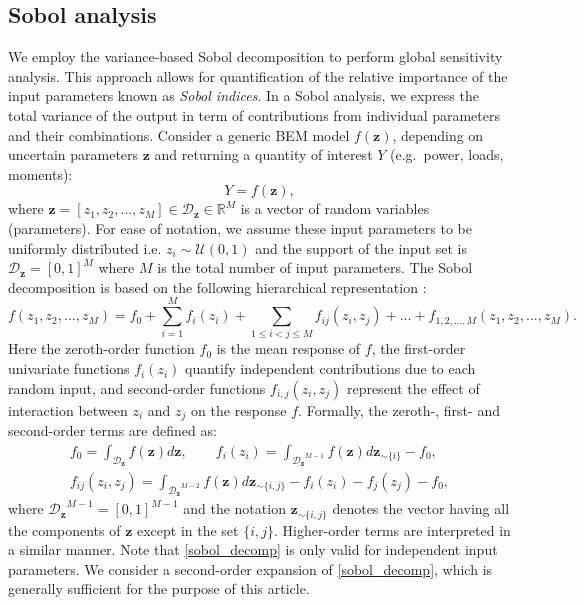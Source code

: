 \subsection{Sobol analysis}
We employ the variance-based Sobol decomposition to perform global sensitivity analysis. This approach allows for quantification of the relative importance of the input parameters known as \emph{Sobol indices}. In a Sobol analysis, we express the total variance of the output in term of contributions from individual parameters and their combinations. Consider a generic BEM model $f(\mathbf{z})$, depending on uncertain parameters $\mathbf{z}$ and returning a quantity of interest $Y$ (e.g.\ power, loads, moments):
\begin{equation}\label{nonlinear_model}
Y = f({\mathbf{z}}),
\end{equation}
where ${\mathbf{z}} = [z_1, z_2, ..., z_M]\in \mathcal{D}_{\mathbf{z}}\in \mathbb{R}^M$ is a vector of random variables (parameters). For ease of notation, we assume these input parameters to be uniformly distributed i.e. $z_i \sim \mathcal{U}(0,1)$ and the support of the input set is $\mathcal{D}_{\mathbf{z}} = [0,1]^M$ where $M$ is the total number of input parameters. The Sobol decomposition is based on the following hierarchical representation \cite{RSmith}:
\begin{equation}\label{sobol_decomp}
f(z_1, z_2, ..., z_M) = f_0+\sum_{i=1}^M f_i(z_i) + \sum_{1\leq i<j\leq M} f_{ij}(z_i,z_j) + ... + f_{1, 2, ..., M}(z_1, z_2, ..., z_M).
\end{equation}
Here the zeroth-order function $f_0$ is the mean response of $f$, the first-order univariate functions $f_i(z_i)$ quantify independent contributions due to each random input, and second-order functions $f_{i,j}(z_i,z_j)$ represent the effect of interaction between $z_i$ and $z_j$ on the response $f$. Formally, the zeroth-, first- and second-order terms are defined as:
\begin{align}\label{sobol_terms}
f_0 = \int_{\mathcal{D}_{\mathbf{z}}}f(\mathbf{z})d\mathbf{z}, \qquad  f_i(z_i)= \int_{{\mathcal{D}_{\mathbf{z}}}^{M-1}}f(\mathbf{z})d\mathbf{z}_{\sim \{i\}} - f_0,\\
f_{ij}(z_i,z_j) = \int_{{\mathcal{D}_{\mathbf{z}}}^{M-2}}f(\mathbf{z})d\mathbf{z}_{\sim \{i,j\}} - f_i(z_i) - f_j(z_j) - f_0,
\end{align}
where ${\mathcal{D}_{\mathbf{z}}}^{M-1} = [0,1]^{M-1}$ and the notation $\mathbf{z}_{\sim \{i,j\}}$ denotes the vector having all the components of $\mathbf{z}$ except in the set $\{i,j\}$. Higher-order terms are interpreted in a similar manner. Note that \eqref{sobol_decomp} is only valid for independent input parameters. We consider a second-order expansion of \eqref{sobol_decomp}, which is generally sufficient for the purpose of this article. 

